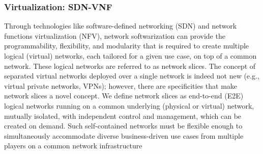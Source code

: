 \documentclass{article}
\begin{document}
\subsubsection{Virtualization: SDN-VNF}

Through technologies like
software-defined networking (SDN) and network
functions virtualization (NFV), network softwarization can provide the programmability, flexibility,
and modularity that is required to create multiple logical (virtual) networks, each tailored for a
given use case, on top of a common network.
These logical networks are referred to as network
slices. The concept of separated virtual networks
deployed over a single network is indeed not new
(e.g., virtual private networks, VPNs); however,
there are specificities that make network slices
a novel concept. We define network slices as
end-to-end (E2E) logical networks running on a
common underlying (physical or virtual) network,
mutually isolated, with independent control and
management, which can be created on demand.
Such self-contained networks must be flexible
enough to simultaneously accommodate diverse
business-driven use cases from multiple players on
a common network infrastructure
\end{document}
